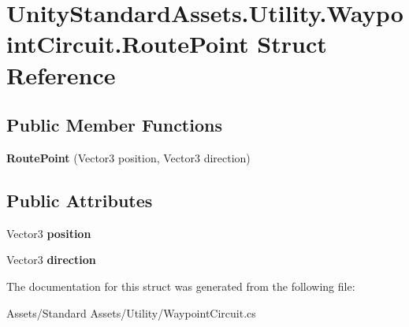 \hypertarget{struct_unity_standard_assets_1_1_utility_1_1_waypoint_circuit_1_1_route_point}{}\section{Unity\+Standard\+Assets.\+Utility.\+Waypoint\+Circuit.\+Route\+Point Struct Reference}
\label{struct_unity_standard_assets_1_1_utility_1_1_waypoint_circuit_1_1_route_point}
\subsection*{Public Member Functions}
\begin{DoxyCompactItemize}
\item 
{\bfseries Route\+Point} (Vector3 position, Vector3 direction)\hypertarget{struct_unity_standard_assets_1_1_utility_1_1_waypoint_circuit_1_1_route_point_a05785eab6554b476e8a3ac1908a3ecd8}{}\label{struct_unity_standard_assets_1_1_utility_1_1_waypoint_circuit_1_1_route_point_a05785eab6554b476e8a3ac1908a3ecd8}

\end{DoxyCompactItemize}
\subsection*{Public Attributes}
\begin{DoxyCompactItemize}
\item 
Vector3 {\bfseries position}\hypertarget{struct_unity_standard_assets_1_1_utility_1_1_waypoint_circuit_1_1_route_point_a0b89576da435ff5adc1d7effc44e7e2d}{}\label{struct_unity_standard_assets_1_1_utility_1_1_waypoint_circuit_1_1_route_point_a0b89576da435ff5adc1d7effc44e7e2d}

\item 
Vector3 {\bfseries direction}\hypertarget{struct_unity_standard_assets_1_1_utility_1_1_waypoint_circuit_1_1_route_point_a1bbfe4f0d556e9e9770a983d8dd52ee2}{}\label{struct_unity_standard_assets_1_1_utility_1_1_waypoint_circuit_1_1_route_point_a1bbfe4f0d556e9e9770a983d8dd52ee2}

\end{DoxyCompactItemize}


The documentation for this struct was generated from the following file\+:\begin{DoxyCompactItemize}
\item 
Assets/\+Standard Assets/\+Utility/Waypoint\+Circuit.\+cs\end{DoxyCompactItemize}

